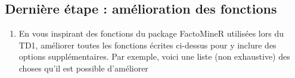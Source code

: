 \documentclass[
]{article}
\newenvironment{Shaded}{\begin{snugshade}}{\end{snugshade}}
\newcommand{\AttributeTok}[1]{\textcolor[rgb]{0.77,0.63,0.00}{#1}}
\newcommand{\ConstantTok}[1]{\textcolor[rgb]{0.00,0.00,0.00}{#1}}
\newcommand{\DecValTok}[1]{\textcolor[rgb]{0.00,0.00,0.81}{#1}}
\newcommand{\FloatTok}[1]{\textcolor[rgb]{0.00,0.00,0.81}{#1}}
\newcommand{\FunctionTok}[1]{\textcolor[rgb]{0.00,0.00,0.00}{#1}}
\newcommand{\NormalTok}[1]{#1}
\newcommand{\SpecialCharTok}[1]{\textcolor[rgb]{0.00,0.00,0.00}{#1}}
\newcommand{\StringTok}[1]{\textcolor[rgb]{0.31,0.60,0.02}{#1}}
\providecommand{\tightlist}{%
  \setlength{\itemsep}{0pt}\setlength{\parskip}{0pt}}
\begin{document}
\begin{Shaded}
\end{Shaded}

\hypertarget{derniuxe8re-uxe9tape-amuxe9lioration-des-fonctions}{%
\subsection{Dernière étape : amélioration des
fonctions}\label{derniuxe8re-uxe9tape-amuxe9lioration-des-fonctions}}

\begin{enumerate}
\def\labelenumi{\arabic{enumi}.}
\setcounter{enumi}{4}
\tightlist
\item
  En vous inspirant des fonctions du package FactoMineR utilisées lors
  du TD1, améliorer toutes les fonctions écrites ci-dessus pour y
  inclure des options supplémentaires. Par exemple, voici une liste (non
  exhaustive) des choses qu'il est possible d'améliorer
\end{enumerate}
\end{document}
